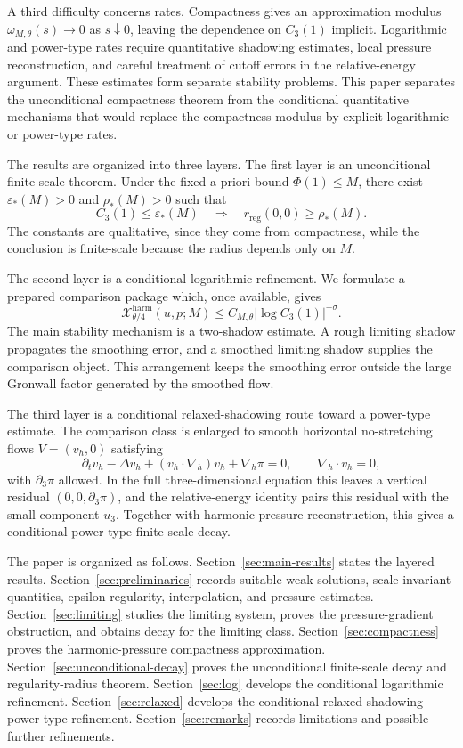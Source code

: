 \documentclass[pdflatex,sn-mathphys-num]{sn-jnl}
\numberwithin{equation}{section}
\theoremstyle{thmstyleone}
\theoremstyle{thmstylethree}
\newcommand{\eps}{\varepsilon}
\newcommand{\reg}{\mathrm{reg}}
\newcommand{\nabh}{\nabla_h}
\newcommand{\calX}{\mathcal X}
\newcommand{\harm}{\mathrm{harm}}
\begin{document}
A third difficulty concerns rates.  Compactness gives an approximation modulus \(\omega_{M,\theta}(s)\to0\) as \(s\downarrow0\), leaving the dependence on \(C_3(1)\) implicit.  Logarithmic and power-type rates require quantitative shadowing estimates, local pressure reconstruction, and careful treatment of cutoff errors in the relative-energy argument.  These estimates form separate stability problems.  This paper separates the unconditional compactness theorem from the conditional quantitative mechanisms that would replace the compactness modulus by explicit logarithmic or power-type rates.

The results are organized into three layers.  The first layer is an unconditional finite-scale theorem.  Under the fixed a priori bound \(\Phi(1)\le M\), there exist \(\eps_*(M)>0\) and \(\rho_*(M)>0\) such that
\[
        C_3(1)\le \eps_*(M)
        \quad\Longrightarrow\quad
        r_{\reg}(0,0)\ge \rho_*(M).
\]
The constants are qualitative, since they come from compactness, while the conclusion is finite-scale because the radius depends only on \(M\).

The second layer is a conditional logarithmic refinement.  We formulate a prepared comparison package which, once available, gives
\[
        \calX^{\harm}_{\theta/4}(u,p;M)
        \le C_{M,\theta}|\log C_3(1)|^{-\sigma}.
\]
The main stability mechanism is a two-shadow estimate.  A rough limiting shadow propagates the smoothing error, and a smoothed limiting shadow supplies the comparison object.  This arrangement keeps the smoothing error outside the large Gronwall factor generated by the smoothed flow.

The third layer is a conditional relaxed-shadowing route toward a power-type estimate.  The comparison class is enlarged to smooth horizontal no-stretching flows \(V=(v_h,0)\) satisfying
\[
        \partial_t v_h-\Delta v_h+(v_h\cdot\nabh)v_h+\nabh\pi=0,
        \qquad \nabh\cdot v_h=0,
\]
with \(\partial_3\pi\) allowed.  In the full three-dimensional equation this leaves a vertical residual \((0,0,\partial_3\pi)\), and the relative-energy identity pairs this residual with the small component \(u_3\).  Together with harmonic pressure reconstruction, this gives a conditional power-type finite-scale decay.

The paper is organized as follows.  Section~\ref{sec:main-results} states the layered results.  Section~\ref{sec:preliminaries} records suitable weak solutions, scale-invariant quantities, epsilon regularity, interpolation, and pressure estimates.  Section~\ref{sec:limiting} studies the limiting system, proves the pressure-gradient obstruction, and obtains decay for the limiting class.  Section~\ref{sec:compactness} proves the harmonic-pressure compactness approximation.  Section~\ref{sec:unconditional-decay} proves the unconditional finite-scale decay and regularity-radius theorem.  Section~\ref{sec:log} develops the conditional logarithmic refinement.  Section~\ref{sec:relaxed} develops the conditional relaxed-shadowing power-type refinement.  Section~\ref{sec:remarks} records limitations and possible further refinements.
\end{document}
